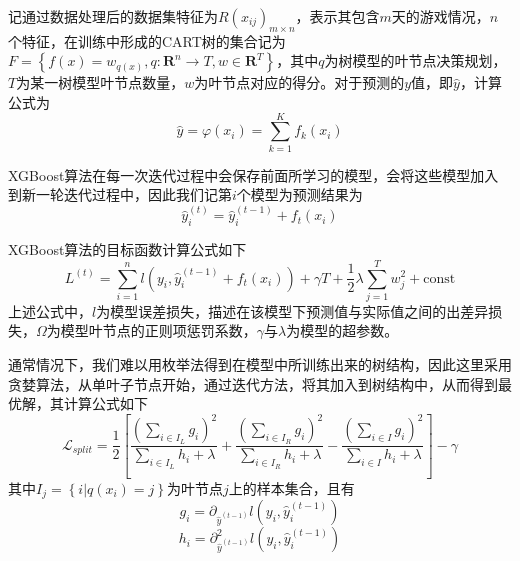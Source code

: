 \documentclass{MathModeling}
\begin{document}
		记通过数据处理后的数据集特征为$R\left(x_{ij}\right)_{m\times n}$，表示其包含$m$天的游戏情况，$n$个特征，在训练中形成的CART树的集合记为$F=\left\{f\left(x\right)=w_{q\left(x\right)},q:\mathbf{R}^n\to T,w\in \mathbf{R}^T\right\}$，其中$q$为树模型的叶节点决策规划，$T$为某一树模型叶节点数量，$w$为叶节点对应的得分\textcolor{blue}{\cite{pxgboost2}}。对于预测的$y$值，即$\hat{y}$，计算公式为
		\begin{equation}
			\hat{y}=\varphi \left( x_i \right) =\sum\limits_{k=1}^K{f_k\left( x_i \right)} \label{fXGBoostypre}
		\end{equation}
	
		XGBoost算法在每一次迭代过程中会保存前面所学习的模型，会将这些模型加入到新一轮迭代过程中，因此我们记第$i$个模型为预测结果为
		\begin{equation}
			\hat{y}_{i}^{\left(t\right)}=\hat{y}_{i}^{\left(t-1\right)}+f_t\left(x_i\right) \label{fXGBoostyprei}
		\end{equation}
		
		XGBoost算法的目标函数计算公式如下
		\begin{equation}
			L^{\left(t\right)}=\sum\limits_{i=1}^{n}l\left(y_i,\hat{y}_{i}^{\left(t-1\right)}+f_t\left(x_i\right)\right)+\gamma T+\frac{1}{2}\lambda\sum\limits_{j=1}^T{w_j^2}+\mathrm{const} \label{fXGBoostL}
		\end{equation}
		上述公式中，$l$为模型误差损失，描述在该模型下预测值与实际值之间的出差异损失，$\Omega$为模型叶节点的正则项惩罚系数，$\gamma$与$\lambda$为模型的超参数\textcolor{blue}{\cite{pxgboost2}}。
		
		通常情况下，我们难以用枚举法得到在模型中所训练出来的树结构，因此这里采用贪婪算法，从单叶子节点开始，通过迭代方法，将其加入到树结构中，从而得到最优解，其计算公式\textcolor{blue}{\cite{pxgboost3}}如下
		\begin{equation}
			\mathcal{L}_{split}=\frac{1}{2}\left[\frac{\left(\sum_{i\in I_L}g_i\right)^2}{\sum_{i\in I_L}h_i+\lambda}+\frac{\left(\sum_{i\in I_R}g_i\right)^2}{\sum_{i\in I_R}h_i+\lambda}-\frac{\left(\sum_{i\in I}g_i\right)^2}{\sum_{i\in I}h_i+\lambda}\right]-\gamma \label{fXGBoostLsplit}
		\end{equation}
		其中$I_j=\left\{i|q\left(x_i\right)=j\right\}$为叶节点$j$上的样本集合\textcolor{blue}{\cite{pxgboost2}}，且有
		\begin{equation}
			g_i=\partial_{\hat{y}^{\left(t-1\right)}}l\left(y_i,\hat{y}_i^{\left(t-1\right)}\right)
		\end{equation}
		\begin{equation}
			h_i=\partial_{\hat{y}^{\left(t-1\right)}}^2l\left(y_i,\hat{y}_i^{\left(t-1\right)}\right)
		\end{equation}
\end{document}
